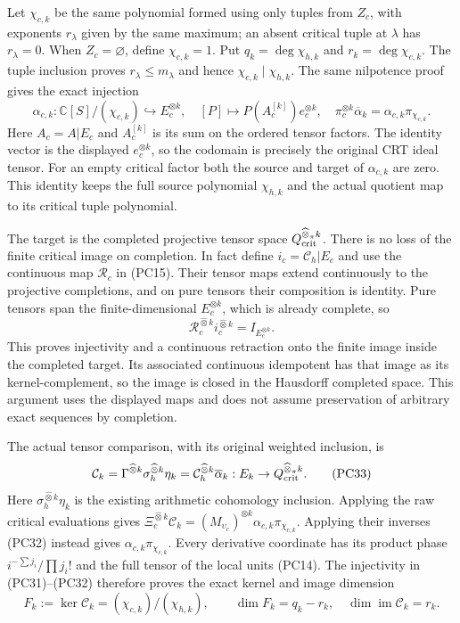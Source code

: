 Let $\chi_{c,k}$ be the same polynomial formed using only tuples
from $Z_c$, with exponents $r_\lambda$ given by the same maximum;
an absent critical tuple at $\lambda$ has $r_\lambda=0$.
When $Z_c=\varnothing$, define $\chi_{c,k}=1$.  Put
$q_k=\deg\chi_{h,k}$ and $r_k=\deg\chi_{c,k}$.
The tuple inclusion proves $r_\lambda\le m_\lambda$ and hence
$\chi_{c,k}\mid\chi_{h,k}$.  The same nilpotence proof gives
the exact injection
\[
 \alpha_{c,k}:\mathbb C[S]/(\chi_{c,k})
                  \hookrightarrow E_c^{\otimes k},\quad
 [P]\mapsto P(A_c^{[k]})e_c^{\otimes k},
 \quad
 \pi_c^{\otimes k}\overline\alpha_k=
          \alpha_{c,k}\pi_{\chi_{c,k}}.
 \tag{PC31}
\]
Here $A_c=A|E_c$ and $A_c^{[k]}$ is its sum on the ordered
tensor factors.  The identity vector is the displayed $e_c^{\otimes k}$,
so the codomain is precisely the original CRT ideal tensor.
For an empty critical factor both the source and target of
$\alpha_{c,k}$ are zero.  This identity keeps the full source
polynomial $\chi_{h,k}$ and the actual quotient map to its critical
tuple polynomial.

The target is the completed projective tensor space
$Q_{\rm crit}^{\widehat\otimes_\pi k}$.  There is no loss of the
finite critical image on completion.  In fact define
$i_c=\mathcal C_h|E_c$ and use the continuous map $\mathcal R_c$
in (PC15).  Their tensor maps extend continuously to the projective
completions, and on pure tensors their composition is identity.
Pure tensors span the finite-dimensional $E_c^{\otimes k}$, which
is already complete, so
\[
 \mathcal R_c^{\widehat\otimes k}
             i_c^{\widehat\otimes k}=I_{E_c^{\otimes k}}.
 \tag{PC32}
\]
This proves injectivity and a continuous retraction onto the finite
image inside the completed target.  Its associated continuous
idempotent has that image as its kernel-complement, so the image is
closed in the Hausdorff completed space.  This argument uses the
displayed maps and does not assume preservation of arbitrary exact
sequences by completion.

The actual tensor comparison, with its original weighted inclusion, is
\[
 \mathcal C_k=
    \Gamma^{\widehat\otimes k}\sigma_h^{\widehat\otimes k}\eta_k
    =\mathcal C_h^{\widehat\otimes k}\overline\alpha_k:
        E_k\to Q_{\rm crit}^{\widehat\otimes_\pi k}.
 \tag{PC33}
\]
Here $\sigma_h^{\widehat\otimes k}\eta_k$ is the existing arithmetic
cohomology inclusion.  Applying the raw critical evaluations gives
$\Xi_c^{\widehat\otimes k}\mathcal C_k=
(M_{\upsilon_c})^{\otimes k}\alpha_{c,k}\pi_{\chi_{c,k}}$.
Applying their inverses (PC32) instead gives
$\alpha_{c,k}\pi_{\chi_{c,k}}$.  Every derivative coordinate has
its product phase $i^{-\sum j_i}/\prod j_i!$ and the full tensor
of the local units (PC14).  The injectivity in (PC31)--(PC32)
therefore proves the exact kernel and image dimension
\[
 \boxed{F_k:=\ker\mathcal C_k=(\chi_{c,k})/(\chi_{h,k}),
       \qquad\dim F_k=q_k-r_k,\quad
       \dim\operatorname{im}\mathcal C_k=r_k.}
 \tag{PC34}
\]


